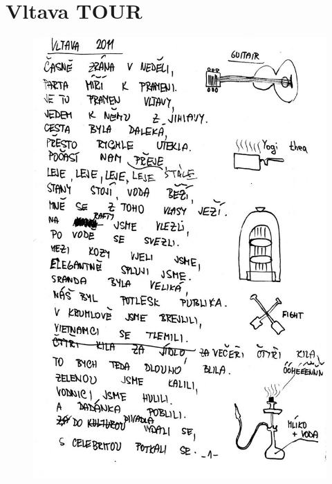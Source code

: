 \section{Vltava TOUR}
\onehalfspacing
\begin{figure}[htbp]
  \centering
  \includegraphics[width=13cm]{img/vlastni1.jpg}
\end{figure}
